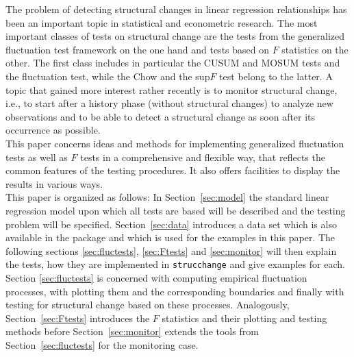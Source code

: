\documentclass[10pt,a4paper]{article}
\begin{document}
The problem of detecting structural changes in linear regression relationships
has been an important topic in statistical and econometric research.
The most important classes of tests on structural change are the tests from the
generalized fluctuation test framework \citep{Z:Kuan+Hornik:1995} on the
one hand and tests based on $F$ statistics
\citep{Z:Hansen:1992,Z:Andrews:1993,Z:Andrews+Ploberger:1994} on the other.
The first class includes in particular the CUSUM and MOSUM tests and the
fluctuation test, while the Chow and the sup$F$ test belong to the latter.
A topic that gained more interest rather recently is to monitor structural
change, i.e., to start after a history phase (without structural changes) to
analyze new observations and to be able to detect a structural change as soon
after its occurrence as possible.\\

This paper concerns ideas and methods for implementing generalized fluctuation
tests as well as $F$ tests in a comprehensive and flexible way, that reflects
the common features of the testing procedures. It also offers facilities to
display the results in various ways.\\

This paper is organized as follows: In Section~\ref{sec:model} the standard
linear regression model upon which all tests are based will be described and the
testing problem will be specified. Section~\ref{sec:data} introduces a data set
which is also available in the package and which is used for the
examples in this paper. The following sections \ref{sec:fluctests},
\ref{sec:Ftests} and \ref{sec:monitor} will then explain the tests, how they are
implemented in {\tt strucchange} and give examples for each. Section
\ref{sec:fluctests} is concerned with computing empirical fluctuation processes,
with plotting them and the corresponding boundaries and finally with testing for
structural change based on these processes. Analogously,
Section~\ref{sec:Ftests} introduces the $F$ statistics and their plotting and
testing methods before Section~\ref{sec:monitor} extends the tools from
Section~\ref{sec:fluctests} for the monitoring case.
\end{document}
